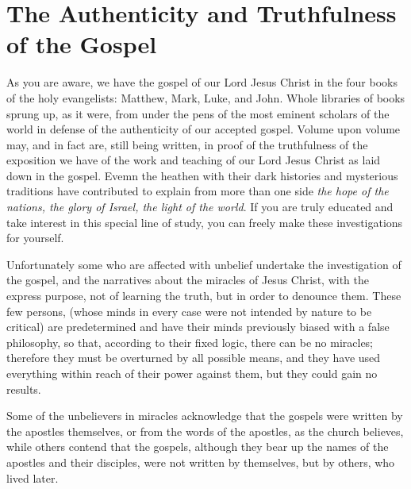 \chapter{The Authenticity and Truthfulness of the Gospel}

As you are aware, we have the gospel of our Lord Jesus Christ in the four books of the holy evangelists: Matthew, Mark, Luke, and John. Whole libraries of books sprung up, as it were, from under the pens of the most eminent scholars of the world in defense of the authenticity of our accepted gospel. Volume upon volume may, and in fact are, still being written, in proof of the truthfulness of the exposition we have of the work and teaching of our Lord Jesus Christ as laid down in the gospel. Evemn the heathen with their dark histories and mysterious traditions have contributed to explain from more than one side \textit{the hope of the nations, the glory of Israel, the light of the world}. If you are truly educated and take interest in this special line of study, you can freely make these investigations for yourself.

Unfortunately some who are affected with unbelief undertake the investigation of the gospel, and the narratives about the miracles of Jesus Christ, with the express purpose, not of learning the truth, but in order to denounce them. These few persons, (whose minds in every case were not intended by nature to be critical) are predetermined and have their minds previously biased with a false philosophy, so that, according to their fixed logic, there can be no miracles; therefore they must be overturned by all possible means, and they have used everything within reach of their power against them, but they could gain no results.

Some of the unbelievers in miracles acknowledge that the gospels were written by the apostles themselves, or from the words of the apostles, as the church believes, while others contend that the gospels, although they bear up the names of the apostles and their disciples, were not written by themselves, but by others, who lived later.

